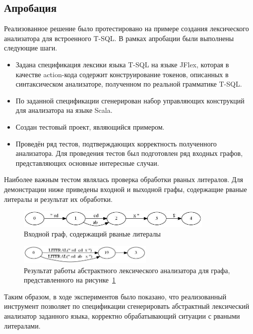 \subsection{Апробация}
Реализованное решение было протестировано на примере создания лексического 
анализатора для встроенного T-SQL. В рамках апробации были выполнены следующие 
шаги. 
\begin{itemize}
    \item Задана спецификация лексики языка T-SQL на языке JFlex, которая в 
    качестве action-кода содержит конструирование токенов, описанных в 
    синтаксическом анализаторе, полученном по реальной грамматике T-SQL.
    \item По заданной спецификации сгенерирован набор управляющих конструкций 
    для анализатора на языке Scala.
    \item Создан тестовый проект, являющийся примером.
    \item Проведён ряд тестов, подтверждающих корректность полученного 
    анализатора. Для проведения тестов был подготовлен ряд входных графов, 
    представляющих основные интересные случаи.
\end{itemize}

Наиболее важным тестом являлась проверка обработки рваных литералов. Для 
демонстрации ниже приведены входной и выходной графы, содержащие рваные 
литералы и результат их обработки.
\begin{figure}[h]
 \label{Literals}
 \centering
 \includegraphics[width=9.5cm]{Verbitskaya/Literals_1.jpg}
 \caption{Входной граф, содержащий рваные литералы}
\end{figure}

\begin{figure}[h]
 \label{LiteralsLex}
 \centering
 \includegraphics[width=6.5cm]{Verbitskaya/Literals_1_lex.jpg}
 \caption{Результат работы абстрактного лексического анализатора для графа, 
    представленного на рисунке~\ref{Literals}}
\end{figure}

Таким образом, в ходе экспериментов было показано, что реализованный инструмент 
позволяет по спецификации сгенерировать абстрактный лексический анализатор 
заданного языка, корректно обрабатывающий ситуации с рваными литералами.


